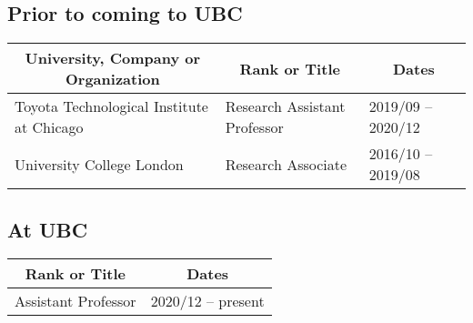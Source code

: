 \documentclass[10pt]{article}
\begin{document}
{\subsection{Prior to coming to UBC}
\noindent\vspace{-2em}
\begin{table}[h!]
  \begin{tabular}{ p{} p{} p{} }
    \toprule
    \multicolumn{1}{c}{\bf University, Company or Organization} & \multicolumn{1}{c}{\bf Rank or Title} & \multicolumn{1}{c}{\bf Dates} \\
    \midrule
    Toyota Technological Institute at Chicago  & Research Assistant Professor  & 2019/09 -- 2020/12 \\
    University College London & Research Associate   & 2016/10 -- 2019/08  \\
    \bottomrule
  \end{tabular}
\end{table}


\vspace{-1em}
\subsection{At UBC}
\noindent\vspace{-2em}
\begin{table}[h!]
  \begin{tabular}{ p{} p{} }
    \toprule
    \multicolumn{1}{c}{\bf Rank or Title} & \multicolumn{1}{c}{\bf Dates} \\
    \midrule
    Assistant Professor               & 2020/12 -- present        \\
    \bottomrule
  \end{tabular}
\end{table}

}
\end{document}
